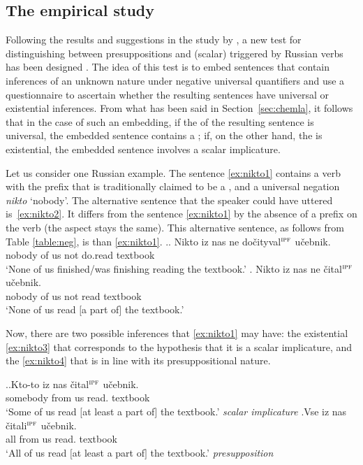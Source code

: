 \subsection{The empirical study}\label{empirical}
Following the results and suggestions in the study by \citet{Chemla:09}, a new test for distinguishing between presuppositions and (scalar)  triggered by Russian verbs has been designed \citep{ZinovaFilip:SALT}. The idea of this test is to embed sentences that contain inferences of an unknown nature under negative universal quantifiers and use a questionnaire to ascertain whether the resulting sentences have universal or existential inferences. From what has been said in Section~\ref{sec:chemla}, it follows that in the case of such an embedding, if the  of the resulting sentence is universal, the embedded sentence contains a ; if, on the other hand, the  is existential, the embedded sentence involves a scalar implicature.

Let us consider one Russian example. The sentence \ref{ex:nikto1} contains a verb with the  prefix  that is traditionally claimed to be a , and a universal negation \textit{nikto} `nobody'. The alternative sentence that the speaker could have uttered is~\ref{ex:nikto2}. It differs from the sentence \ref{ex:nikto1} by the absence of a prefix on the verb (the aspect stays the same). This alternative sentence, as follows from Table \ref{table:neg}, is  than \ref{ex:nikto1}.
\ex.\label{ex:nikto}\ag. \label{ex:nikto1}Nikto iz nas ne do\v{c}ityval$^{\textsc{ipf}}$ u\v{c}ebnik.\\
nobody of us not do.read textbook\\
 `None of us finished/was finishing reading the textbook.'
\bg. \label{ex:nikto2}Nikto iz nas ne \v{c}ital$^{\textsc{ipf}}$ u\v{c}ebnik.\\
nobody of us not read textbook\\
 `None of us read $[$a part of$]$ the textbook.'

Now, there are two possible inferences that \ref{ex:nikto1} may have: the existential  \ref{ex:nikto3} that corresponds to the hypothesis that it is a scalar implicature, and the  \ref{ex:nikto4} that is in line with its presuppositional nature.

\ex.\ag.\label{ex:nikto3}Kto-to iz nas \v{c}ital$^{\textsc{ipf}}$ u\v{c}ebnik.\\
somebody from us read. textbook\\
`Some of us read $[$at least a part of$]$ the textbook.' \hfill \textit{scalar implicature}
\bg.\label{ex:nikto4}Vse iz nas \v{c}itali$^{\textsc{ipf}}$ u\v{c}ebnik.\\
all from us read. textbook\\
`All of us read $[$at least a part of$]$ the textbook.' \hfill \textit{presupposition}

